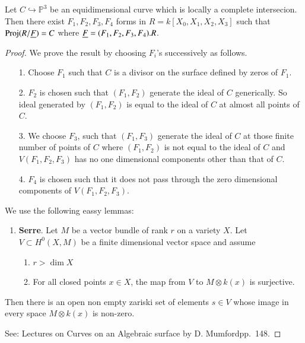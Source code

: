 \setcounter{section}{1}
\setcounter{propn}{1}
\begin{propn}\label{chap1:prop1.2}
Let $C\hookrightarrow\mathbb{P}^3$ be an equidimensional curve which
is locally a complete intersecion. Then there exist $F_1,F_2,F_3,F_4$
forms in $R=k[X_0,X_1,X_2,X_3]$ such that $\operatorname{Proj}(R/\underline{F})=C$
where $\underline{F}=(F_1,F_2,\break F_3,F_4).R$.
\end{propn}

\begin{proof}
We prove the result by choosing $F_i$'s successively as follows.
\begin{itemize}
\item [1.] Choose $F_1$ such that $C$ is a divisor on the surface
defined by zeros of $F_1$. 

\item [2.] $F_2$ is chosen such that $(F_1,F_2)$ generate the ideal of
  $C$ generically. So ideal generated by $(F_1, F_2)$ is equal to the
  ideal of $C$ at almost all points of $C$.

\item [3.] We choose $F_3$, such that $(F_1,F_3)$ generate the ideal
  of $C$ at those finite number of points of $C$ where $(F_1,F_2)$ is
  not equal to the ideal of $C$ and $V(F_1,F_2,F_3)$ has no one
  dimensional components other than that of $C$.

\item [4.] $F_4$ is chosen such that it does not pass through the zero
  dimensional components of $V(F_1,F_2,F_3)$.
\end{itemize}

We use the following eassy lemmas:

\begin{enumerate}
\item {\bf Serre}. Let $M$ be a vector bundle of rank $r$ on a variety
  $X$. Let $V\subset H^0(X,M)$ be a finite dimensional vector space
  and assume 
\begin{enumerate}
\item $r>\dim X$
\item For all closed points $x\in X$, the map from $V$ to $M\otimes
  k(x)$ is surjective.
\end{enumerate}
\end{enumerate}

Then there is an open non empty zariski set of elements $s\in V$ whose
image in every space $M\otimes k(x)$ is non-zero.

\noindent See: Lectures on Curves on an Algebraic surface by
D. Mumford\break pp.~148. 
\end{proof}

